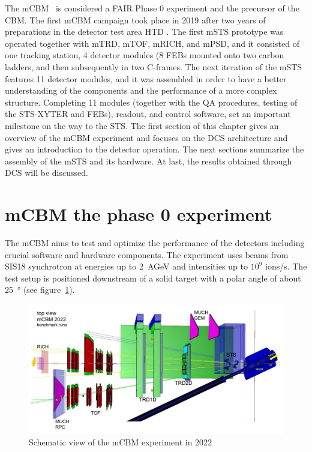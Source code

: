 The mCBM~\cite{mCBM} is considered a FAIR Phase 0 experiment and the precursor of the \gls{CBM}. The first mCBM campaign took place in 2019 after two years of preparations in the detector test area HTD \cite{progress_report_2017_sturm}. The first \gls{mSTS} prototype was operated together with mTRD, mTOF, mRICH, and mPSD, and it consisted of one tracking station, 4 detector modules (8 \glspl{FEB} mounted onto two carbon ladders, and then subsequently in two C-frames. The next iteration of the \gls{mSTS} features 11 detector modules, and it was assembled in order to have a better understanding of the components and the performance of a more complex structure. Completing 11 modules (together with the QA procedures, testing of the STS-XYTER and \gls{FEB}s), readout, and control software, set an important milestone on the way to the \gls{STS}. The first section of this chapter gives an overview of the mCBM experiment and focuses on the \gls{DCS} architecture and gives an introduction to the detector operation. The next sections summarize the assembly of the \gls{mSTS} and its hardware. At last, the results obtained through \gls{DCS} will be discussed. 

\section{mCBM the phase 0 experiment}
The mCBM aims to test and optimize the performance of the detectors including crucial software and hardware components. The experiment uses beams from SIS18 synchrotron at energies up to 2~AGeV and intensities up to $10^{9}$ ions/s. The test setup is positioned downstream of a solid target with a polar angle of about \SI{25}{\degree} (see figure~\ref{fig_mcbm}).

\begin{figure}[!h]
\centering
\includegraphics[width=1\columnwidth]{Chapter6/DCS/images/mcbm_2021_setup.png}
\caption{Schematic view of the mCBM experiment in 2022}
\label{fig_mcbm}
\end{figure}

